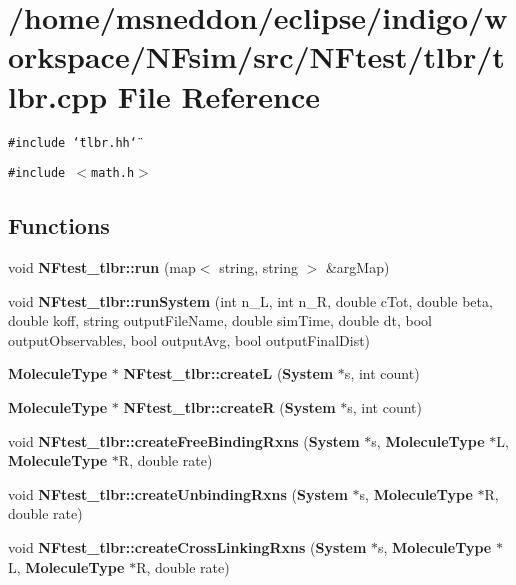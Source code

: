 \section{/home/msneddon/eclipse/indigo/workspace/NFsim/src/NFtest/tlbr/tlbr.cpp File Reference}
\label{tlbr_8cpp}


{\tt \#include \char`\"{}tlbr.hh\char`\"{}}\par
{\tt \#include $<$math.h$>$}\par
\subsection*{Functions}
\begin{CompactItemize}
\item 
void {\bf NFtest\_\-tlbr::run} (map$<$ string, string $>$ \&argMap)
\item 
void {\bf NFtest\_\-tlbr::runSystem} (int n\_\-L, int n\_\-R, double cTot, double beta, double koff, string outputFileName, double simTime, double dt, bool outputObservables, bool outputAvg, bool outputFinalDist)
\item 
{\bf MoleculeType} $\ast$ {\bf NFtest\_\-tlbr::createL} ({\bf System} $\ast$s, int count)
\item 
{\bf MoleculeType} $\ast$ {\bf NFtest\_\-tlbr::createR} ({\bf System} $\ast$s, int count)
\item 
void {\bf NFtest\_\-tlbr::createFreeBindingRxns} ({\bf System} $\ast$s, {\bf MoleculeType} $\ast$L, {\bf MoleculeType} $\ast$R, double rate)
\item 
void {\bf NFtest\_\-tlbr::createUnbindingRxns} ({\bf System} $\ast$s, {\bf MoleculeType} $\ast$R, double rate)
\item 
void {\bf NFtest\_\-tlbr::createCrossLinkingRxns} ({\bf System} $\ast$s, {\bf MoleculeType} $\ast$L, {\bf MoleculeType} $\ast$R, double rate)
\end{CompactItemize}
